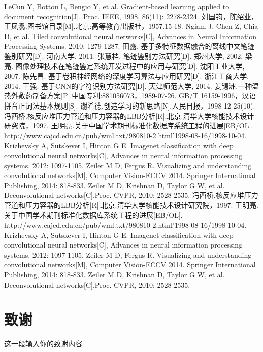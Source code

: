 \documentclass[fontset=windows,AutoFakeBold,a4paper]{article}
\newcommand{\tnewroman}{\fontspec{Times New Roman}}  %
\begin{document}
\fancyhead[CO]{\songti \leftmark}
\begin{thebibliography}{99}
    \tnewroman
     LeCun Y, Bottou L, Bengio Y, et al. Gradient-based learning applied to document recognition[J]. Proc. IEEE, 1998, 86(11): 2278-2324.
     刘国钧，陈绍业，王凤翥.图书馆目录[M].北京:高等教育出版社，1957.15-18.
     Ngiam J, Chen Z, Chia D, et al. Tiled convolutional neural networks[C], Advances in Neural Information Processing Systems. 2010: 1279-1287.
     田露. 基于多特征数据融合的离线中文笔迹鉴别研究[D]. 河南大学, 2011.
     张慧档. 笔迹鉴别方法研究[D]. 郑州大学, 2002.
     梁亮. 图像处理技术在笔迹鉴定系统开发过程中的应用与研究[D]. 沈阳工业大学, 2007.
     陈先昌. 基于卷积神经网络的深度学习算法与应用研究[D]. 浙江工商大学, 2014.
     王强. 基于CNN的字符识别方法研究[D]. 天津师范大学, 2014.
     姜锡洲.一种温热外敷药制备方案[P].中国专利:881056073，1989-07-26.
     GB/T 16159-1996，汉语拼音正词法基本规则[S].
     谢希德.创造学习的新思路[N].人民日报，1998-12-25(10).
     冯西桥.核反应堆压力管道和压力容器的LBB分析[R].北京:清华大学核能技术设计研究院，1997.
     王明亮.关于中国学术期刊标准化数据库系统工程的进展[EB/OL].
       http://www.cajcd.edu.cn/pub/wml.txt/980810-2.html'1998-08-16/1998-10-04.
     Krizhevsky A, Sutskever I, Hinton G E. Imagenet classification with deep convolutional neural networks[C], Advances in neural information processing systems. 2012: 1097-1105.
     Zeiler M D, Fergus R. Visualizing and understanding convolutional networks[M], Computer Vision-ECCV 2014. Springer International Publishing, 2014: 818-833.
     Zeiler M D, Krishnan D, Taylor G W, et al. Deconvolutional networks[C],Proc. CVPR, 2010: 2528-2535.
     冯西桥.核反应堆压力管道和压力容器的LBB分析[R].北京:清华大学核能技术设计研究院，1997.
     王明亮.关于中国学术期刊标准化数据库系统工程的进展[EB/OL].
       http://www.cajcd.edu.cn/pub/wml.txt/980810-2.html'1998-08-16/1998-10-04.
     Krizhevsky A, Sutskever I, Hinton G E. Imagenet classification with deep convolutional neural networks[C], Advances in neural information processing systems. 2012: 1097-1105.
     Zeiler M D, Fergus R. Visualizing and understanding convolutional networks[M], Computer Vision-ECCV 2014. Springer International Publishing, 2014: 818-833.
     Zeiler M D, Krishnan D, Taylor G W, et al. Deconvolutional networks[C],Proc. CVPR, 2010: 2528-2535.

\end{thebibliography}
\pagebreak[4]

\thispagestyle{plain}
\section*{致谢}
\begin{spacing}{1.7}
    \songti
    这一段输入你的致谢内容
\end{spacing}
\end{document}
